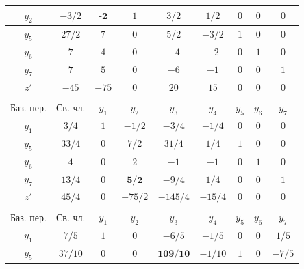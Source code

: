 \documentclass[a4paper,14pt]{extarticle}
\begin{document}
\begin{center}
\begin{longtable}{|c|c|c|c|c|c|c|c|c|}
        \hline
        $y_2$     & $-3/2$     & $\textbf{-2}$     & $1$      & $3/2$    & $1/2$      & $0$       & $0$   & $0$       \\
        \hline
        $y_5$     & $27/2$     & $7$      & $0$      & $5/2$    & $-3/2$     & $1$       & $0$   & $0$       \\
        \hline
        $y_6$     & $7$        & $4$      & $0$      & $-4$     & $-2$       & $0$       & $1$   & $0$       \\
        \hline
        $y_7$     & $7$        & $5$      & $0$      & $-6$     & $-1$       & $0$       & $0$   & $1$       \\
        \hline
        $z'$      & $-45$      & $-75$    & $0$      & $20$     & $15$       & $0$       & $0$   & $0$       \\
        \hline
        \multicolumn{9}{c}{}                                                                                 \\
        \hline
        Баз. пер. & Св. чл.    & $y_1$    & $y_2$    & $y_3$    & $y_4 $     & $y_5$     & $y_6$ & $y_7$     \\
        \hline
        $y_1$     & $3/4$      & $1$      & $-1/2$   & $-3/4$   & $-1/4$     & $0$       & $0$   & $0$       \\
        \hline
        $y_5$     & $33/4$     & $0$      & $7/2$    & $31/4$   & $1/4$      & $1$       & $0$   & $0$       \\
        \hline
        $y_6$     & $4$        & $0$      & $2$      & $-1$     & $-1$       & $0$       & $1$   & $0$       \\
        \hline
        $y_7$     & $13/4$     & $0$      & $\textbf{5/2}$    & $-9/4$   & $1/4$      & $0$       & $0$   & $1$       \\
        \hline
        $z'$      & $45/4$     & $0$      & $-75/2$  & $-145/4$ & $-15/4$    & $0$       & $0$   & $0$       \\
        \hline
        \multicolumn{9}{c}{}                                                                                 \\
        \hline
        Баз. пер. & Св. чл.    & $y_1$    & $y_2$    & $y_3$    & $y_4 $     & $y_5$     & $y_6$ & $y_7$     \\
        \hline
        $y_1$     & $7/5$      & $1$      & $0$      & $-6/5$   & $-1/5$     & $0$       & $0$   & $1/5$     \\
        \hline
        $y_5$     & $37/10$    & $0$      & $0$      & $\textbf{109/10}$ & $-1/10$    & $1$       & $0$   & $-7/5$    \\

\end{longtable}
\end{center}
\end{document}
